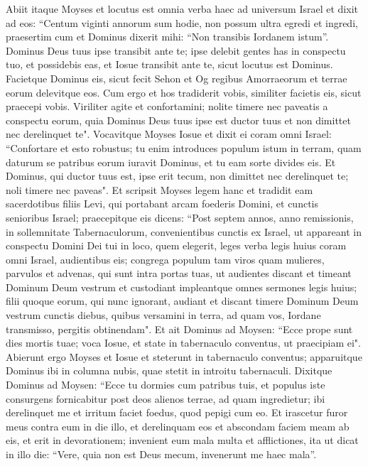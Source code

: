 \begin{biblechapter} 
\verse Abiit itaque Moyses et locutus est omnia verba haec ad universum Israel 
\verse et dixit ad eos: “Centum viginti annorum sum hodie, non possum ultra egredi et ingredi, praesertim cum et Dominus dixerit mihi: “Non transibis Iordanem istum”. 
\verse Dominus Deus tuus ipse transibit ante te; ipse delebit gentes has in conspectu tuo, et possidebis eas, et Iosue transibit ante te, sicut locutus est Dominus. 
\verse Facietque Dominus eis, sicut fecit Sehon et Og regibus Amorraeorum et terrae eorum delevitque eos. 
\verse Cum ergo et hos tradiderit vobis, similiter facietis eis, sicut praecepi vobis. 
\verse Viriliter agite et confortamini; nolite timere nec paveatis a conspectu eorum, quia Dominus Deus tuus ipse est ductor tuus et non dimittet nec derelinquet te". 
\verse Vocavitque Moyses Iosue et dixit ei coram omni Israel: “Confortare et esto robustus; tu enim introduces populum istum in terram, quam daturum se patribus eorum iuravit Dominus, et tu eam sorte divides eis. 
\verse Et Dominus, qui ductor tuus est, ipse erit tecum, non dimittet nec derelinquet te; noli timere nec paveas". 
\verse Et scripsit Moyses legem hanc et tradidit eam sacerdotibus filiis Levi, qui portabant arcam foederis Domini, et cunctis senioribus Israel; 
\verse praecepitque eis dicens: “Post septem annos, anno remissionis, in sollemnitate Tabernaculorum, 
\verse convenientibus cunctis ex Israel, ut appareant in conspectu Domini Dei tui in loco, quem elegerit, leges verba legis huius coram omni Israel, audientibus eis; 
\verse congrega populum tam viros quam mulieres, parvulos et advenas, qui sunt intra portas tuas, ut audientes discant et timeant Dominum Deum vestrum et custodiant impleantque omnes sermones legis huius;  
\verse filii quoque eorum, qui nunc ignorant, audiant et discant timere Dominum Deum vestrum cunctis diebus, quibus versamini in terra, ad quam vos, Iordane transmisso, pergitis obtinendam". 
\verse Et ait Dominus ad Moysen: “Ecce prope sunt dies mortis tuae; voca Iosue, et state in tabernaculo conventus, ut praecipiam ei". Abierunt ergo Moyses et Iosue et steterunt in tabernaculo conventus; 
\verse apparuitque Dominus ibi in columna nubis, quae stetit in introitu tabernaculi. 
\verse Dixitque Dominus ad Moysen: “Ecce tu dormies cum patribus tuis, et populus iste consurgens fornicabitur post deos alienos terrae, ad quam ingredietur; ibi derelinquet me et irritum faciet foedus, quod pepigi cum eo. 
\verse Et irascetur furor meus contra eum in die illo, et derelinquam eos et abscondam faciem meam ab eis, et erit in devorationem; invenient eum mala multa et afflictiones, ita ut dicat in illo die: “Vere, quia non est Deus mecum, invenerunt me haec mala”. 

\end{biblechapter}
